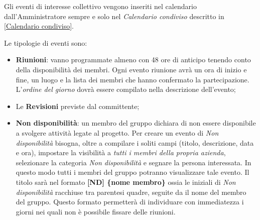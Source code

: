 	Gli eventi di interesse collettivo vengono inseriti nel calendario dall'Amministratore sempre e solo nel \emph{Calendario condiviso} descritto in \ref{Calendario condiviso}.
	
	Le tipologie di eventi sono:
	\begin{itemize}
		\item \textbf{Riunioni}: vanno programmate almeno con 48 ore di anticipo tenendo conto della disponibilità dei membri. Ogni evento riunione avrà un ora di inizio e fine, un luogo e la lista dei membri che hanno confermato la partecipazione. L'\emph{ordine del giorno} dovrà essere compilato nella descrizione dell'evento;
		\item Le \textbf{Revisioni} previste dal committente;
		\item \textbf{Non disponibilità}: un membro del gruppo dichiara di non essere disponibile a svolgere attività legate al progetto. Per creare un evento di \emph{Non disponibilità} bisogna, oltre a compilare i soliti campi (titolo, descrizione, data e ora), impostare la visibilità a \emph{tutti i membri della propria azienda}, selezionare la categoria \emph{Non disponibilità} e segnare la persona interessata. In questo modo tutti i membri del gruppo \GroupName{} potranno visualizzare tale evento. 
		Il titolo sarà nel formato \textbf{[ND] \{nome membro\}} ossia le iniziali di \emph{Non disponibilità} racchiuse tra parentesi quadre, seguite da il nome del membro del gruppo. Questo formato permetterà di individuare con immediatezza i giorni nei quali non è possibile fissare delle riunioni.
	\end{itemize}